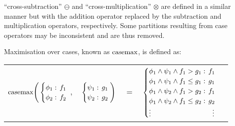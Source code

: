 ``cross-subtraction'' {\footnotesize$\ominus$} and ``cross-multiplication'' {\footnotesize$\otimes$} are defined in a similar manner but with the addition operator replaced by the subtraction and multiplication operators, respectively. Some partitions resulting from case operators may be inconsistent and are thus removed.

Maximisation over cases, known as $\mathrm{casemax}$, is defined as:
\vspace{-0.5em}
{\footnotesize 
    \abovedisplayskip=0pt
    \belowdisplayskip=0pt
    \begin{center}
        \begin{tabular}{r c c c l}
            \hspace{-7mm} 
            
            $\mathrm{casemax} \Bigg(
            \begin{cases}
            \phi_1: \hspace{-1mm} & \hspace{-1mm} f_1 \\ 
            \phi_2: \hspace{-1mm} & \hspace{-1mm} f_2 \\ 
            \end{cases}$
            $,$
            &
            \hspace{-4mm}
            $\begin{cases}
            \psi_1: \hspace{-1mm} & \hspace{-1mm} g_1 \\ 
            \psi_2: \hspace{-1mm} & \hspace{-1mm} g_2 \\ 
            \end{cases} \Bigg)$
            &
            \hspace{-4mm} 
            $ = $
            &
            \hspace{-4mm}
            $\begin{cases}
            \phi_1 \wedge \psi_1 \wedge f_1 > g_1    : & \hspace{-2mm} f_1 \\ 
            \phi_1 \wedge \psi_1 \wedge f_1 \leq g_1 : & \hspace{-2mm} g_1 \\ 
            \phi_1 \wedge \psi_2 \wedge f_1 > g_2    : & \hspace{-2mm} f_1 \\ 
            \phi_1 \wedge \psi_2 \wedge f_1 \leq g_2 : & \hspace{-2mm} g_2 \\ 
            \vdots & \vdots
            \end{cases}$
        \end{tabular}
    \end{center}
}%

